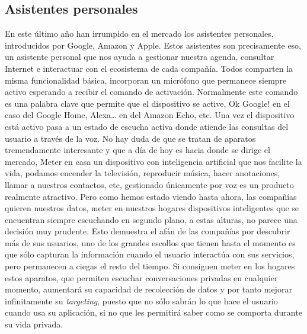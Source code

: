 \documentclass[12pt,a4paper,oneside]{book} %
\begin{document}
\subsection{Asistentes personales}
En este último año han irrumpido en el mercado los asistentes personales, introducidos por Google, Amazon y Apple. Estos asistentes son precisamente eso, un asistente personal que nos ayuda a gestionar nuestra agenda, consultar Internet e interactuar con el ecosistema de cada compañía. 
\newline
\newline
Todos comparten la misma funcionalidad básica, incorporan un micrófono que permanece siempre activo esperando a recibir el comando de activación. Normalmente este comando es una palabra clave que permite que el dispositivo se active, Ok Google! en el caso del Google Home, Alexa… en del Amazon Echo, etc. Una vez el dispositivo está activo pasa a un estado de escucha activa donde atiende las consultas del usuario a través de la voz. 
\newline
\newline
No hay duda de que se tratan de aparatos tremendamente interesante y que a día de hoy es hacia donde se dirige el mercado, Meter en casa un dispositivo con inteligencia artificial que nos facilite la vida, podamos encender la televisión, reproducir música, hacer anotaciones, llamar a nuestros contactos, etc, gestionado únicamente por voz es un producto realmente atractivo.  
\newline
\newline
Pero como hemos estado viendo hasta ahora, las compañías quieren nuestros datos, meter en nuestros hogares dispositivos inteligentes que se encuentran siempre escuchando en segundo plano, a estas alturas, no parece una decisión muy prudente. 
\newline
\newline
Esto demuestra el afán de las compañías por descubrir más de sus usuarios, uno de los grandes escollos que tienen hasta el momento es que sólo capturan la información cuando el usuario interactúa con sus servicios, pero permanecen a ciegas el resto del tiempo. Si consiguen meter en los hogares estos aparatos, que permiten escuchar conversaciones privadas en cualquier momento, aumentará su capacidad de recolección de datos y por tanto mejorar infinitamente su \textit{targeting}, puesto que no sólo sabrán lo que hace el usuario cuando usa su aplicación, si no que les permitirá saber como se comporta durante su vida privada. 
\newline
\end{document}
